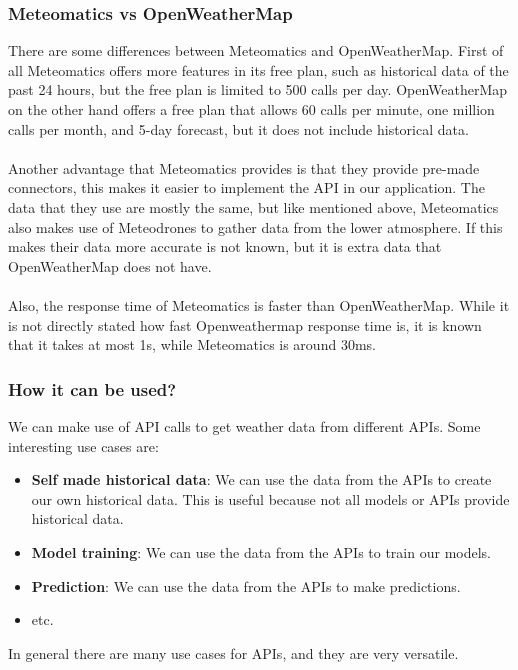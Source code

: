 \documentclass[../paper.tex]{subfiles}
\begin{document}
    \subsubsection{Meteomatics vs OpenWeatherMap}
    There are some differences between Meteomatics and OpenWeatherMap.
    First of all Meteomatics offers more features in its free plan, such as historical data of the past 24 hours, but the free plan is limited to 500 calls per day\cite{c1}.
    OpenWeatherMap on the other hand offers a free plan that allows 60 calls per minute, one million calls per month, and 5-day forecast, but it does not include historical data\cite{b1}.
    \\\\
    Another advantage that Meteomatics provides is that they provide pre-made connectors, this makes it easier to implement the API in our application.
    The data that they use are mostly the same, but like mentioned above, Meteomatics also makes use of Meteodrones to gather data from the lower atmosphere\cite{c3}.
    If this makes their data more accurate is not known, but it is extra data that OpenWeatherMap does not have.
    \\\\
    Also, the response time of Meteomatics is faster than OpenWeatherMap.
    While it is not directly stated how fast Openweathermap response time is, it is known that it takes at most 1s, while Meteomatics is around 30ms\cite{c1}.

    \subsubsection{How it can be used?}
    We can make use of API calls to get weather data from different APIs.
    Some interesting use cases are:
    \begin{itemize}
        \item \textbf{Self made historical data}: We can use the data from the APIs to create our own historical data.
        This is useful because not all models or APIs provide historical data.
        \item \textbf{Model training}: We can use the data from the APIs to train our models.
        \item \textbf{Prediction}: We can use the data from the APIs to make predictions.
        \item etc.
    \end{itemize}
    In general there are many use cases for APIs, and they are very versatile.
\end{document}
